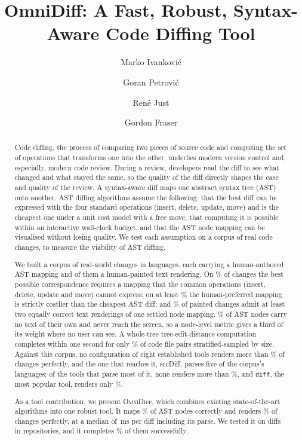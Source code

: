 \documentclass[sigconf]{acmart}
\title{OmniDiff: A Fast, Robust, Syntax-Aware Code Diffing Tool}
\author{Marko Ivankovi\'{c}}
\affiliation{%
  \institution{Universit\"{a}t Passau}
  \city{Passau}
  \country{Germany}
}
\author{Goran Petrovi\'{c}}
\affiliation{%
  \institution{Universit\"{a}t Passau}
  \city{Passau}
  \country{Germany}
}
\author{Ren\'{e} Just}
\affiliation{%
  \institution{University of Washington}
  \city{Seattle}
  \country{USA}
}
\author{Gordon Fraser}
\affiliation{%
  \institution{Universit\"{a}t Passau}
  \city{Passau}
  \country{Germany}
}
\begin{document}
\begin{abstract}
Code diffing, the process of comparing two pieces of source code and computing the set of
operations that transforms one into the other, underlies modern version control and, especially,
modern code review. During a review, developers read the diff to see what changed and what stayed the
same, so the quality of the diff directly shapes the ease and quality of the review. A
syntax-aware diff maps one abstract syntax tree (AST) onto another. AST diffing algorithms assume the following: that the best
diff can be expressed with the four standard operations (insert, delete, update, move) and is
the cheapest one under a unit cost model with a free move, that computing it is possible within
an interactive wall-clock budget, and that the AST node mapping can be
visualised without losing quality. We test each assumption on a corpus of real code changes, to measure the viability of AST
diffing.

We built a corpus of \NumFixtures{} real-world changes in \NumFixtureLanguages{} languages, each
carrying a human-authored AST mapping and \PaintingFixtures{} of them a human-painted text rendering.
On \AmbiguityListPct{}\% of changes the best possible correspondence requires a mapping that the
common operations (insert, delete, update and move) cannot express; on at least \CostHumanHigherPct{}\%
the human-preferred mapping is strictly costlier than the cheapest AST diff; and
\PaintingDualPct{}\% of painted changes admit at least two equally correct text renderings of one
settled node mapping. \InvisibleNodeShare{}\% of AST nodes carry no text of their own and never reach
the screen, so a node-level metric gives a third of its weight where no user can see. A
whole-tree tree-edit-distance computation completes within one second for only \RqOneCodePct{}\%
of \RqOnePairsAttempted{} code file pairs stratified-sampled by size. Against this corpus, no
configuration of eight established tools renders more than \SrcDiffPerfectPct{}\% of changes
perfectly, and the one that reaches it, srcDiff, parses five of the corpus's languages; of the tools
that parse most of it, none renders more than \DifftasticPerfectPct{}\%, and
\texttt{diff}, the most popular tool, renders only \UnixDiffPerfectPct{}\%.

As a tool contribution, we present \textsc{OmniDiff}, which combines existing state-of-the-art
algorithms into one robust tool. It maps \NodeAccuracyPct{}\% of AST nodes correctly and renders
\OmniDiffPerfectPct{}\% of changes perfectly, at a median of \SpeedOmniDiffPFifty{}\,ms per diff
including its parse. We tested it on \RobustnessFullAttempted{} diffs
in \NumRepos{} repositories, and it completes \RobustnessFullCompletedPct{}\% of them
successfully.
\end{abstract}
\end{document}
